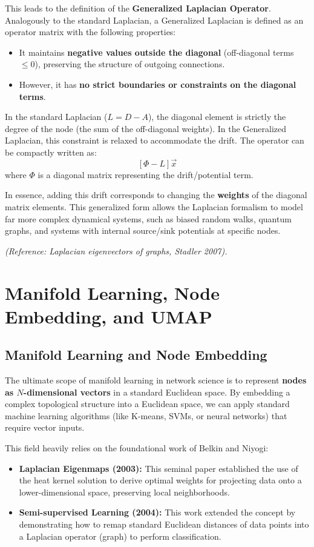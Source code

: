 This leads to the definition of the \textbf{Generalized Laplacian Operator}.
Analogously to the standard Laplacian, a Generalized Laplacian is defined as an operator matrix with the following properties:
\begin{itemize}
    \item It maintains \textbf{negative values outside the diagonal} (off-diagonal terms \( \leq 0 \)), preserving the structure of outgoing connections.
    \item However, it has \textbf{no strict boundaries or constraints on the diagonal terms}.
\end{itemize}

In the standard Laplacian (\( L = D - A \)), the diagonal element is strictly the degree of the node (the sum of the off-diagonal weights). In the Generalized Laplacian, this constraint is relaxed to accommodate the drift. The operator can be compactly written as:
\[
    [\Phi - L]\vec{x}
\]
where \( \Phi \) is a diagonal matrix representing the drift/potential term.

In essence, adding this drift corresponds to changing the \textbf{weights} of the diagonal matrix elements. This generalized form allows the Laplacian formalism to model far more complex dynamical systems, such as biased random walks, quantum graphs, and systems with internal source/sink potentials at specific nodes.

\textit{(Reference: Laplacian eigenvectors of graphs, Stadler 2007).}

\section{Manifold Learning, Node Embedding, and UMAP}

\subsection{Manifold Learning and Node Embedding}
The ultimate scope of manifold learning in network science is to represent \textbf{nodes as \( N \)-dimensional vectors} in a standard Euclidean space. By embedding a complex topological structure into a Euclidean space, we can apply standard machine learning algorithms (like K-means, SVMs, or neural networks) that require vector inputs.

This field heavily relies on the foundational work of Belkin and Niyogi:
\begin{itemize}
    \item \textbf{Laplacian Eigenmaps (2003):} This seminal paper established the use of the heat kernel solution to derive optimal weights for projecting data onto a lower-dimensional space, preserving local neighborhoods.
    \item \textbf{Semi-supervised Learning (2004):} This work extended the concept by demonstrating how to remap standard Euclidean distances of data points into a Laplacian operator (graph) to perform classification.
\end{itemize}


